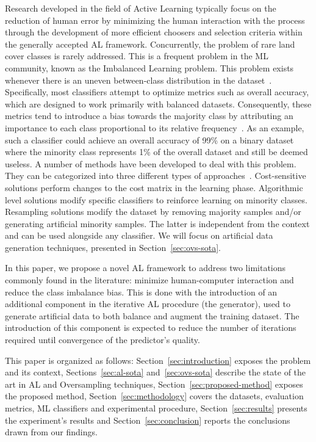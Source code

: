 \documentclass[parskip=full]{scrartcl}
\begin{document}
Research developed in the field of Active Learning typically focus on the
reduction of human error by minimizing the human interaction with the process
through the development of more efficient choosers and selection criteria
within the generally accepted AL framework.  Concurrently, the problem of rare
land cover classes is rarely addressed. This is a frequent problem in the ML
community, known as the Imbalanced Learning problem. This problem exists
whenever there is an uneven between-class distribution in the
dataset~\cite{Chawla2004}. Specifically, most classifiers attempt to optimize
metrics such as overall accuracy, which are designed to work primarily with
balanced datasets. Consequently, these metrics tend to introduce a bias towards
the majority class by attributing an importance to each class proportional to
its relative frequency~\cite{Maxwell2018}. As an example, such a classifier
could achieve an overall accuracy of 99\% on a binary dataset where the
minority class represents 1\% of the overall dataset and still be deemed
useless. A number of methods have been developed to deal with this problem.
They can be categorized into three different types of
approaches~\cite{Fernandez2013,Kaur2019}. Cost-sensitive solutions perform
changes to the cost matrix in the learning phase. Algorithmic level solutions
modify specific classifiers to reinforce learning on minority classes.
Resampling solutions modify the dataset by removing majority samples and/or
generating artificial minority samples. The latter is independent from the
context and can be used alongside any classifier. We will focus on artificial
data generation techniques, presented in Section~\ref{sec:ovs-sota}.

In this paper, we propose a novel AL framework to address two limitations
commonly found in the literature: minimize human-computer interaction and
reduce the class imbalance bias. This is done with the introduction of an
additional component in the iterative AL procedure (the generator), used to
generate artificial data to both balance and augment the training dataset. The
introduction of this component is expected to reduce the number of iterations
required until convergence of the predictor's quality.

This paper is organized as follows: Section~\ref{sec:introduction} exposes the
problem and its context, Sections~\ref{sec:al-sota} and~\ref{sec:ovs-sota}
describe the state of the art in AL and Oversampling techniques,
Section~\ref{sec:proposed-method} exposes the proposed method,
Section~\ref{sec:methodology} covers the datasets, evaluation metrics, ML
classifiers and experimental procedure, Section~\ref{sec:results} presents the
experiment's results and Section~\ref{sec:conclusion} reports the
conclusions drawn from our findings.
\end{document}
